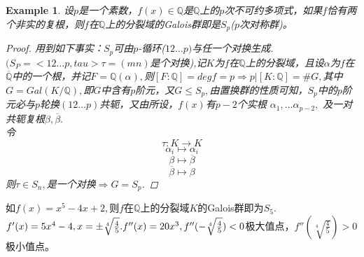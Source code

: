 \documentclass[UTF8]{article}
\newtheorem{exa}{Example}[section]
\begin{document}
\begin{exa}
设$p$是一个素数，$f(x)\in \mathbb{Q}$是$\mathbb{Q}$上的$p$次不可约多项式，如果$f$恰有两个非实的复根，则$f$在$\mathbb{Q}$上的分裂域的Galois群即是$S_p$($p$次对称群)。
\begin{proof}
	用到如下事实：$S_p$可由$p$-循环($12\ldots p)$与任一个对换生成.$(S_P=<12\ldots p,tau>\tau=(mn)$是个对换),记$K$为$f$在$\mathbb{Q}$上的分裂域，且设$\alpha$为$f$在$\overline{\mathbb{Q}}$中的一个根，并记$F=\mathbb{Q}(\alpha),$则$[F:\mathbb{Q}]=degf=p\Rightarrow p|[K:\mathbb{Q}]=\#G,$其中$G=Gal(K/\mathbb{Q}),$即$G$中含有$p$阶元，又$G\leqslant S_p,$由置换群的性质可知，$S_p$中的$p$阶元必与$p$轮换$(12\ldots p)$共轭，又由所设，$f(x)$有$p-2$个实根
	$\alpha_1,\ldots\alpha_{p-2},$ 及一对共轭复根$\beta,\overline{\beta}.$\\
	令
	$$\tau:K\longrightarrow K$$
	$$
	\alpha_i\longmapsto \alpha_i$$
	$$
	\beta\longmapsto\overline{\beta}$$
	$$
	\overline{\beta}\longmapsto\beta$$
	则$\tau\in S_n,$是一个对换$\Rightarrow G=S_p$.
\end{proof}
\end{exa}
如$f(x)=x^5-4x+2,$则$f$在$\mathbb{Q}$上的分裂域$K$的Galois群即为$S_5$.\\
$f'(x)=5x^4-4,x=\pm\sqrt[4]{\frac{4}{5}}.\\
f''(x)=20x^3,f''(-\sqrt[4]{\frac{4}{5}})<0$极大值点，$f''(\sqrt[4]{\frac{4}{5}})>0$极小值点。



 
\end{document}
